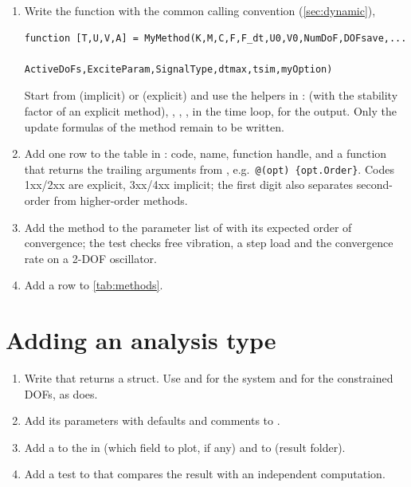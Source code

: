 \begin{enumerate}
  \item Write the function with the common calling convention
    (\cref{sec:dynamic}),
\begin{lstlisting}
function [T,U,V,A] = MyMethod(K,M,C,F,F_dt,U0,V0,NumDoF,DOFsave,...
                     ActiveDoFs,ExciteParam,SignalType,dtmax,tsim,myOption)
\end{lstlisting}
    Start from  (implicit) or 
    (explicit) and use the helpers in :
     (with the stability factor of an explicit method),
    , , ,
     in the time loop,  for the output.
    Only the update formulas of the method remain to be written.
  \item Add one row to the table in : code, name,
    function handle, and a function that returns the trailing arguments from
    , e.g.\ \texttt{@(opt) \{opt.Order\}}. Codes
    1xx/2xx are explicit, 3xx/4xx implicit; the first digit also separates
    second-order from higher-order methods.
  \item Add the method to the parameter list of  with
    its expected order of convergence; the test checks free vibration, a step load
    and the convergence rate on a 2-DOF oscillator.
  \item Add a row to \cref{tab:methods}.
\end{enumerate}

\section{Adding an analysis type}

\begin{enumerate}
  \item Write  that returns a
     struct. Use  and  for
    the system and  for the constrained DOFs, as
     does.
  \item Add its parameters with defaults and comments to .
  \item Add a  to the  in  (which
    field to plot, if any) and to  (result folder).
  \item Add a test to  that compares the result with an
    independent computation.
\end{enumerate}

